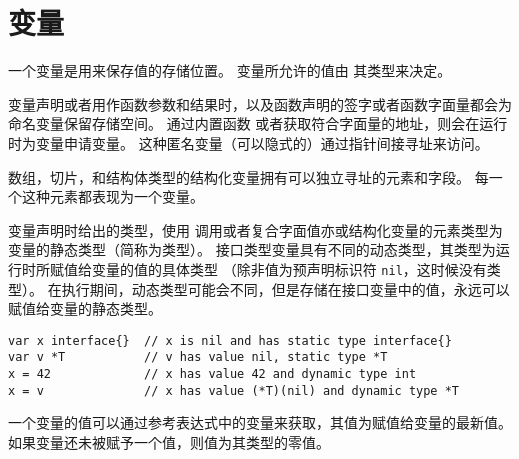 
\chapter{变量}
一个变量是用来保存值的存储位置。
变量所允许的值由 其类型来决定。

变量声明或者用作函数参数和结果时，以及函数声明的签字或者函数字面量都会为命名变量保留存储空间。
通过内置函数  或者获取符合字面量的地址，则会在运行时为变量申请变量。
这种匿名变量（可以隐式的）通过指针间接寻址来访问。%

数组，切片，和结构体类型的结构化变量拥有可以独立寻址的元素和字段。
每一个这种元素都表现为一个变量。 

变量声明时给出的类型，使用  调用或者复合字面值亦或结构化变量的元素类型为变量的静态类型（简称为类型）。
接口类型变量具有不同的动态类型，其类型为运行时所赋值给变量的值的具体类型
（除非值为预声明标识符 \lstinline|nil|，这时候没有类型）。
在执行期间，动态类型可能会不同，但是存储在接口变量中的值，永远可以赋值给变量的静态类型。
\begin{lstlisting}[style=golang]
var x interface{}  // x is nil and has static type interface{}
var v *T           // v has value nil, static type *T
x = 42             // x has value 42 and dynamic type int
x = v              // x has value (*T)(nil) and dynamic type *T
\end{lstlisting}
一个变量的值可以通过参考表达式中的变量来获取，其值为赋值给变量的最新值。
如果变量还未被赋予一个值，则值为其类型的零值。